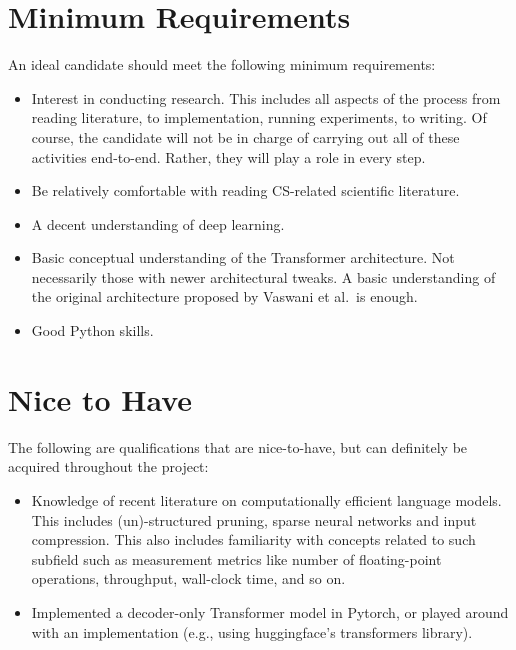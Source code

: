 \documentclass{article}
\begin{document}
\section{Minimum Requirements}
An ideal candidate should meet the following minimum requirements:
\begin{itemize}
    \item Interest in conducting research. This includes all aspects of the process from reading literature, to implementation, running experiments, to writing. Of course, the candidate will not be in charge of carrying out all of these activities end-to-end. Rather, they will play a role in every step.
    \item Be relatively comfortable with reading CS-related scientific literature.
    \item A decent understanding of deep learning.
    \item Basic conceptual understanding of the Transformer architecture. Not necessarily those with newer architectural tweaks. A basic understanding of the original architecture proposed by Vaswani et al.\ is enough.
    \item Good Python skills.
\end{itemize}

\section{Nice to Have}
The following are qualifications that are nice-to-have, but can definitely be acquired throughout the project:

\begin{itemize}
    \item Knowledge of recent literature on computationally efficient language models. This includes (un)-structured pruning, sparse neural networks and input compression. This also includes familiarity with concepts related to such subfield such as measurement metrics like number of floating-point operations, throughput, wall-clock time, and so on.
    \item Implemented a decoder-only Transformer model in Pytorch, or played around with an implementation (e.g., using huggingface's transformers library).
\end{itemize}


\printbibliography
\end{document}
